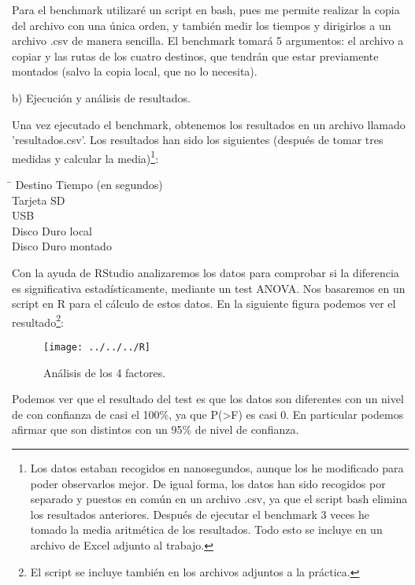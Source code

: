 \documentclass[a4paper, 11pt]{article} %
\begin{document}
Para el benchmark utilizaré un script en bash, pues me permite realizar la copia del archivo con una única orden, y también medir los tiempos y dirigirlos a un archivo .csv de manera sencilla. El benchmark tomará 5 argumentos: el archivo a copiar y las rutas de los cuatro destinos, que tendrán que estar previamente montados (salvo la copia local, que no lo necesita). 

b) Ejecución y análisis de resultados. 

Una vez ejecutado el benchmark, obtenemos los resultados en un archivo llamado 'resultados.csv'. Los resultados han sido los siguientes (después de tomar tres medidas y calcular la media)\footnote{Los datos estaban recogidos en nanosegundos, aunque los he modificado para poder observarlos mejor. De igual forma, los datos han sido recogidos por separado y puestos en común en un archivo .csv, ya que el script bash elimina los resultados anteriores. Después de ejecutar el benchmark 3 veces he tomado la media aritmética de los resultados. Todo esto se incluye en un archivo de Excel adjunto al trabajo.}: 

\begin{tabbing}
\hspace*{4cm} \= \hspace*{6cm} \kill
Destino \> Tiempo (en segundos) \\
Tarjeta SD  \\
USB  \\
Disco Duro local  \\
Disco Duro montado  \\
\end{tabbing}

Con la ayuda de RStudio analizaremos los datos para comprobar si la diferencia es significativa estadísticamente, mediante un test ANOVA. Nos basaremos en un script en R para el cálculo de estos datos. En la siguiente figura podemos ver el resultado\footnote{El script se incluye también en los archivos adjuntos a la práctica.}: 

\pagebreak

\begin{figure}[htpb]
\centering
\texttt{[image: ../../../R]}
\caption{Análisis de los 4 factores.}
\end{figure}

Podemos ver que el resultado del test es que los datos son diferentes con un nivel de con confianza de casi el 100\%, ya que P(>F) es casi 0. En particular podemos afirmar que son distintos con un 95\% de nivel de confianza. 
\end{document}

